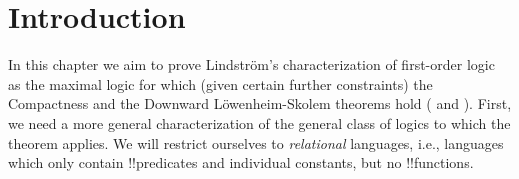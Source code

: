 \documentclass[../../../include/open-logic-section]{subfiles}
\begin{document}
\section{Introduction}

In this chapter we aim to prove Lindstr\"om's characterization of
first-order logic as the maximal logic for which (given certain
further constraints) the Compactness and the Downward
L\"owenheim-Skolem theorems hold
( and
). First, we need a more general
characterization of the general class of logics to which the theorem
applies. We will restrict ourselves to \emph{relational} languages,
i.e., languages which only contain !!{predicate}s and individual
constants, but no !!{function}s.
\end{document}
